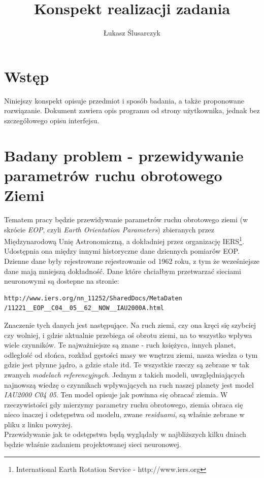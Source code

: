 \documentclass[12pt,a4]{article}
\title{Konspekt realizacji zadania}
\author{Łukasz Ślusarczyk}
\begin{document}
\maketitle
\tableofcontents
\clearpage

\section{Wstęp}
Niniejszy konspekt opisuje przedmiot i sposób badania, a także
proponowane rozwiązanie. Dokument zawiera opis programu od strony
użytkownika, jednak bez szczegółowego opisu interfejsu.

\section{Badany problem - przewidywanie parametrów ruchu obrotowego
Ziemi}

\indent Tematem pracy będzie przewidywanie parametrów ruchu obrotowego
ziemi (w skrócie \emph{EOP}, czyli \emph{Earth Orientation Parameters})
zbieranych przez Międzynarodową Unię Astronomiczną, a dokładniej przez
organizację IERS\footnote{International Earth Rotation Service - http://www.iers.org}.
Udostępnia ona między innymi historyczne dane dziennych pomiarów EOP.
Dzienne dane były rejestrowane rejestrowanie od 1962 roku, z tym że wcześniejsze dane mają
mniejszą dokładność. Dane które chciałbym przetwarzać sieciami neuronowymi
są dostepne na stronie:
\begin{verbatim}
http://www.iers.org/nn_11252/SharedDocs/MetaDaten
/11221__EOP__C04__05__62__NOW__IAU2000A.html
\end{verbatim}
\indent Znaczenie tych danych jest następujące. Na ruch ziemi, czy ona
kręci się szybciej czy wolniej, i gdzie aktualnie przebiega oś obrotu ziemi,
na to wszystko wpływa wiele czynników. Te najważniejsze są znane -
ruch księżyca, innych planet, odległość od słońca, rozkład gęstości masy we
wnętrzu ziemi, nasza wiedza o tym gdzie jest płynne jądro, a gdzie
stałe itd. Te wszystkie rzeczy są zebrane w tak zwanych \emph{modelach
referencyjnych}. Jednym z takich modeli, uwzględniających
najnowszą wiedzę o czynnikach wpływających na ruch naszej planety jest
model \emph{IAU2000 C04 05}. Ten model opisuje jak powinna się obracać ziemia. 
W rzeczywistości gdy mierzymy parametry ruchu obrotowego, ziemia obraca się nieco inaczej i
odstępstwa od modelu, zwane \emph{residuami}, są właśnie zebrane w
pliku z linku powyżej.\\
\indent Przewidywanie jak te odstępstwa będą wyglądały w najbliższych kilku
dniach będzie właśnie zadaniem projektowanej sieci neuronowej.
\end{document}
